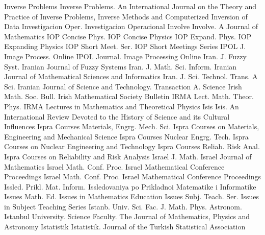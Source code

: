 {Inverse Problems}
{Inverse Problems. An International Journal on the Theory and Practice of Inverse Problems, Inverse Methods and Computerized Inversion of Data}
{Investigacion Oper.}
{Investigacion Operacional}
{Involve}
{Involve. A Journal of Mathematics}
{IOP Concise Phys.}
{IOP Concise Physics}
{IOP Expand. Phys.}
{IOP Expanding Physics}
{IOP Short Meet. Ser.}
{IOP Short Meetings Series}
{IPOL J. Image Process. Online}
{IPOL Journal. Image Processing Online}
{Iran. J. Fuzzy Syst.}
{Iranian Journal of Fuzzy Systems}
{Iran. J. Math. Sci. Inform.}
{Iranian Journal of Mathematical Sciences and Informatics}
{Iran. J. Sci. Technol. Trans. A Sci.}
{Iranian Journal of Science and Technology. Transaction A. Science}
{Irish Math. Soc. Bull.}
{Irish Mathematical Society Bulletin}
{IRMA Lect. Math. Theor. Phys.}
{IRMA Lectures in Mathematics and Theoretical Physics}
{Isis}
{Isis. An International Review Devoted to the History of Science and its Cultural Influences}
{Ispra Courses Materials, Engrg. Mech. Sci.}
{Ispra Courses on Materials, Engineering and Mechanical Science}
{Ispra Courses Nuclear Engrg. Tech.}
{Ispra Courses on Nuclear Engineering and Technology}
{Ispra Courses Reliab. Risk Anal.}
{Ispra Courses on Reliability and Risk Analysis}
{Israel J. Math.}
{Israel Journal of Mathematics}
{Israel Math. Conf. Proc.}
{Israel Mathematical Conference Proceedings}
{Israel Math. Conf. Proc.}
{Israel Mathematical Conference Proceedings}
{Issled. Prikl. Mat. Inform.}
{Issledovaniya po Prikladnoi Matematike i Informatike}
{Issues Math. Ed.}
{Issues in Mathematics Education}
{Issues Subj. Teach. Ser.}
{Issues in Subject Teaching Series}
{Istanb. Univ. Sci. Fac. J. Math. Phys. Astronom.}
{Istanbul University. Science Faculty. The Journal of Mathematics, Physics and Astronomy}
{Istatistik}
{Istatistik. Journal of the Turkish Statistical Association}
